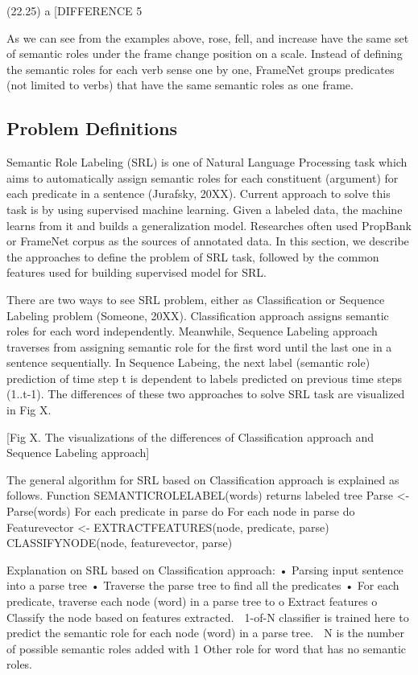(22.25) a [DIFFERENCE 5%

As we can see from the examples above, rose, fell, and increase have the same set of semantic roles under the frame change position on a scale. Instead of defining the semantic roles for each verb sense one by one, FrameNet groups predicates (not limited to verbs) that have the same semantic roles as one frame.

\subsection{Problem Definitions}
Semantic Role Labeling (SRL) is one of Natural Language Processing task which aims to automatically assign semantic roles for each constituent (argument) for each predicate in a sentence (Jurafsky, 20XX). Current approach to solve this task is by using supervised machine learning. Given a labeled data, the machine learns from it and builds a generalization model. Researches often used PropBank or FrameNet corpus as the sources of annotated data. In this section, we describe the approaches to define the problem of SRL task, followed by the common features used for building supervised model for SRL.

There are two ways to see SRL problem, either as Classification or Sequence Labeling problem (Someone, 20XX). Classification approach assigns semantic roles for each word independently. Meanwhile, Sequence Labeling approach traverses from assigning semantic role for the first word until the last one in a sentence sequentially. In Sequence Labeing, the next label (semantic role) prediction of time step t is dependent to labels predicted on previous time steps (1..t-1). The differences of these two approaches to solve SRL task are visualized in Fig X.

[Fig X. The visualizations of the differences of Classification approach and Sequence Labeling approach]

The general algorithm for SRL based on Classification approach is explained as follows.
Function SEMANTICROLELABEL(words) returns labeled tree
Parse <- Parse(words)
For each predicate in parse do
For each node in parse do
Featurevector <- EXTRACTFEATURES(node, predicate, parse)
CLASSIFYNODE(node, featurevector, parse)

Explanation on SRL based on Classification approach:
•	Parsing input sentence into a parse tree
•	Traverse the parse tree to find all the predicates
•	For each predicate, traverse each node (word) in a parse tree to
o	Extract features
o	Classify the node based on features extracted. 
	1-of-N classifier is trained here to predict the semantic role for each node (word) in a parse tree.
	N is the number of possible semantic roles added with 1 Other role for word that has no semantic roles.

